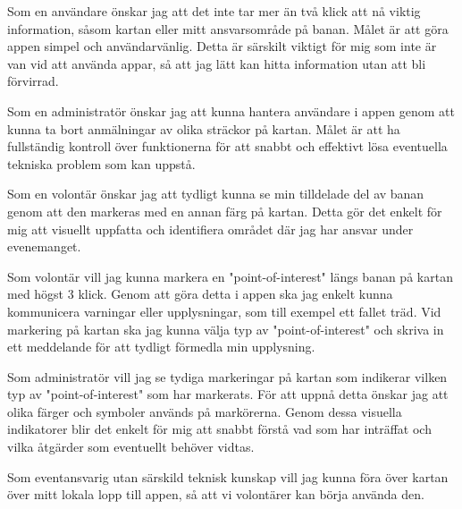 \vspace{1em}
Som en användare önskar jag att det inte tar mer än två klick att nå viktig information, såsom kartan eller mitt ansvarsområde på banan. Målet är att göra appen simpel och användarvänlig. Detta är särskilt viktigt för mig som inte är van vid att använda appar, så att jag lätt kan hitta information utan att bli förvirrad.

\vspace{1em}
Som en administratör önskar jag att kunna hantera användare i appen genom att kunna ta bort anmälningar av olika sträckor på kartan. Målet är att ha fullständig kontroll över funktionerna för att snabbt och effektivt lösa eventuella tekniska problem som kan uppstå.

\vspace{1em}
Som en volontär önskar jag att tydligt kunna se min tilldelade del av banan genom att den markeras med en annan färg på kartan. Detta gör det enkelt för mig att visuellt uppfatta och identifiera området där jag har ansvar under evenemanget.

\vspace{1em}

Som volontär vill jag kunna markera en "point-of-interest" längs banan på kartan med högst 3 klick. Genom att göra detta i appen ska jag enkelt kunna kommunicera varningar eller upplysningar, som till exempel ett fallet träd. Vid markering på kartan ska jag kunna välja typ av "point-of-interest" och skriva in ett meddelande för att tydligt förmedla min upplysning.
\vspace{1em}

Som administratör vill jag se tydiga markeringar på kartan som indikerar vilken typ av "point-of-interest" som har markerats. För att uppnå detta önskar jag att olika färger och symboler används på markörerna. Genom dessa visuella indikatorer blir det enkelt för mig att snabbt förstå vad som har inträffat och vilka åtgärder som eventuellt behöver vidtas.

\vspace{1em}
Som eventansvarig utan särskild teknisk kunskap vill jag kunna föra över kartan över mitt lokala lopp till appen, så att vi volontärer kan börja använda den. 



